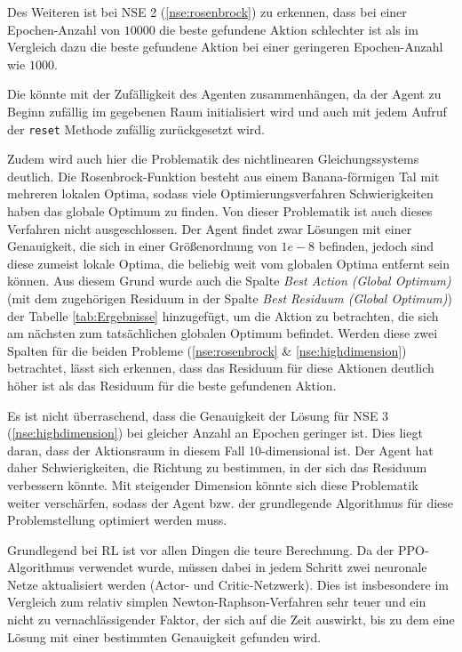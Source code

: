 \documentclass{article}
\def\code#1{\texttt{#1}}
\theoremstyle{newline}
\begin{document}
\begin{onehalfspace}
Des Weiteren ist bei NSE 2 (\ref{nse:rosenbrock}) zu erkennen, dass bei einer Epochen-Anzahl von $10000$ die beste gefundene Aktion schlechter ist als im Vergleich dazu die beste gefundene Aktion bei einer geringeren Epochen-Anzahl wie $1000$. 

Die könnte mit der Zufälligkeit des Agenten zusammenhängen, da der Agent zu Beginn zufällig im gegebenen Raum initialisiert wird und auch mit jedem Aufruf der \code{reset} Methode zufällig zurückgesetzt wird.

Zudem wird auch hier die Problematik des nichtlinearen Gleichungssystems deutlich. Die Rosenbrock-Funktion besteht aus einem \glqq Banana\grqq{}-förmigen Tal mit mehreren lokalen Optima, sodass viele Optimierungsverfahren Schwierigkeiten haben das globale Optimum zu finden. Von dieser Problematik ist auch dieses Verfahren nicht ausgeschlossen. Der Agent findet zwar Lösungen mit einer Genauigkeit, die sich in einer Größenordnung von $1e-8$ befinden, jedoch sind diese zumeist lokale Optima, die beliebig weit vom globalen Optima entfernt sein können. Aus diesem Grund wurde auch die Spalte \textit{Best Action (Global Optimum)} (mit dem zugehörigen Residuum in der Spalte \textit{Best Residuum (Global Optimum)}) der Tabelle \ref{tab:Ergebnisse} hinzugefügt, um die Aktion zu betrachten, die sich am nächsten zum tatsächlichen globalen Optimum befindet. Werden diese zwei Spalten für die beiden Probleme (\ref{nse:rosenbrock} \& \ref{nse:highdimension}) betrachtet, lässt sich erkennen, dass das Residuum für diese Aktionen deutlich höher ist als das Residuum für die beste gefundenen Aktion.
\medskip

Es ist nicht überraschend, dass die Genauigkeit der Lösung für NSE 3 (\ref{nse:highdimension}) bei gleicher Anzahl an Epochen geringer ist. Dies liegt daran, dass der Aktionsraum in diesem Fall 10-dimensional ist. Der Agent hat daher Schwierigkeiten, die Richtung zu bestimmen, in der sich das Residuum verbessern könnte. Mit steigender Dimension könnte sich diese Problematik weiter verschärfen, sodass der Agent bzw. der grundlegende Algorithmus für diese Problemstellung optimiert werden muss.
\medskip

Grundlegend bei RL ist vor allen Dingen die \glqq teure\grqq{} Berechnung. Da der PPO-Algorithmus verwendet wurde, müssen dabei in jedem Schritt zwei neuronale Netze aktualisiert werden (Actor- und Critic-Netzwerk). Dies ist insbesondere im Vergleich zum relativ simplen Newton-Raphson-Verfahren sehr teuer und ein nicht zu vernachlässigender Faktor, der sich auf die Zeit auswirkt, bis zu dem eine Lösung mit einer bestimmten Genauigkeit gefunden wird.
\\


\end{onehalfspace}
\end{document}
